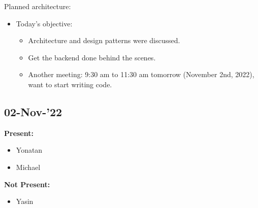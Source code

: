 \documentclass[11pt]{article}
\begin{document}
    \item    Planned architecture:
    \begin{itemize}
        \begin{itemize}
            \item repository style for the databases.
            \item Event-driven for reminders.
            \item Component-based.
        \end{itemize}
        \item Today's objective:
        \begin{itemize}
            \item Architecture and design patterns were discussed.
            \item Get the backend done behind the scenes.
            \item Another meeting: 9:30 am to 11:30 am tomorrow (November 2nd, 2022), want to start writing code.
        \end{itemize}
    \end{itemize}

    \subsection{02-Nov-’22}\label{subsec:02-nov-222}

    \textbf{Present:}
    \begin{itemize}
        \item Yonatan
        \item Michael
    \end{itemize}


    \textbf{Not Present:}

    \begin{itemize}
        \item Yasin
    \end{itemize}
\end{document}
